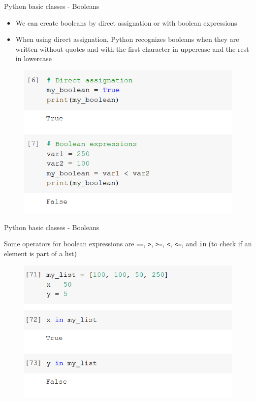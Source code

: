 \documentclass[aspectratio=169]{beamer}
\begin{document}
\begin{frame}{Python basic classes - Booleans}

	\begin{itemize}	
		\item We can create booleans by direct assignation or with boolean expressions
		\item When using direct assignation, Python recognizes booleans when they are written without quotes and with the first character in uppercase and the rest in lowercase
	\end{itemize}

	\begin{figure}
		\centering
		\includegraphics[width=0.5\linewidth]{img/bool_assignation.png}
	\end{figure}

\end{frame}

\begin{frame}{Python basic classes - Booleans}

	Some operators for boolean expressions are \texttt{==}, \texttt{>}, \texttt{>=}, \texttt{<}, \texttt{<=}, and \texttt{in} (to check if an element is part of a list)

	\begin{figure}
		\centering
		\includegraphics[width=0.6\linewidth]{img/bool_in.png}
	\end{figure}

\end{frame}
\end{document}
